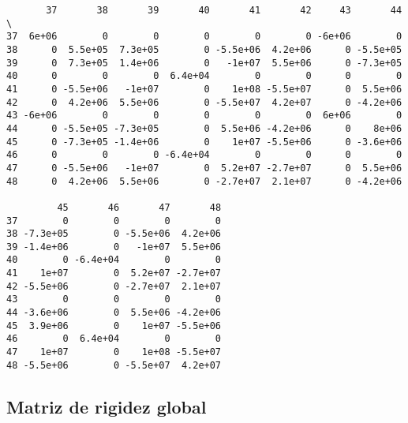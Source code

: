 \documentclass{article}
\begin{document}
    
    \begin{verbatim}
       37       38       39       40       41       42     43       44  \
37  6e+06        0        0        0        0        0 -6e+06        0   
38      0  5.5e+05  7.3e+05        0 -5.5e+06  4.2e+06      0 -5.5e+05   
39      0  7.3e+05  1.4e+06        0   -1e+07  5.5e+06      0 -7.3e+05   
40      0        0        0  6.4e+04        0        0      0        0   
41      0 -5.5e+06   -1e+07        0    1e+08 -5.5e+07      0  5.5e+06   
42      0  4.2e+06  5.5e+06        0 -5.5e+07  4.2e+07      0 -4.2e+06   
43 -6e+06        0        0        0        0        0  6e+06        0   
44      0 -5.5e+05 -7.3e+05        0  5.5e+06 -4.2e+06      0    8e+06   
45      0 -7.3e+05 -1.4e+06        0    1e+07 -5.5e+06      0 -3.6e+06   
46      0        0        0 -6.4e+04        0        0      0        0   
47      0 -5.5e+06   -1e+07        0  5.2e+07 -2.7e+07      0  5.5e+06   
48      0  4.2e+06  5.5e+06        0 -2.7e+07  2.1e+07      0 -4.2e+06   

         45       46       47       48  
37        0        0        0        0  
38 -7.3e+05        0 -5.5e+06  4.2e+06  
39 -1.4e+06        0   -1e+07  5.5e+06  
40        0 -6.4e+04        0        0  
41    1e+07        0  5.2e+07 -2.7e+07  
42 -5.5e+06        0 -2.7e+07  2.1e+07  
43        0        0        0        0  
44 -3.6e+06        0  5.5e+06 -4.2e+06  
45  3.9e+06        0    1e+07 -5.5e+06  
46        0  6.4e+04        0        0  
47    1e+07        0    1e+08 -5.5e+07  
48 -5.5e+06        0 -5.5e+07  4.2e+07  
    \end{verbatim}

    
    \subsection{Matriz de rigidez global}\label{matriz-de-rigidez-global}
\end{document}
